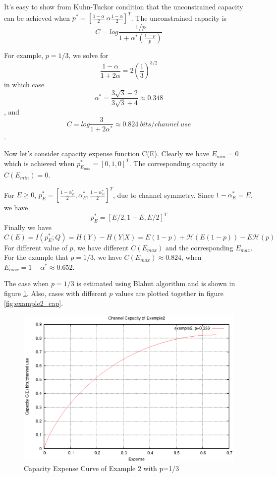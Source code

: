 \documentclass[a4paper,10pt]{article}
\begin{document}
It's easy to show from Kuhn-Tuckor condition that the unconstrained capacity can be achieved when $p^*=[\frac{1-\alpha}{2}\ \alpha \frac{1-\alpha}{2}]^T$. The unconstrained capacity is
\begin{equation}
 C=log{\frac{1/p}{1+\alpha^*\left(\frac{1-p}{p}\right)}}
\end{equation}

For example, $p=1/3$, we solve for
\begin{equation}
 \frac{1-\alpha}{1+2\alpha}=2\left(\frac{1}{3}\right)^{3/2}
\end{equation}
in which case
\[\alpha^*=\frac{3\sqrt{3}-2}{3\sqrt{3}+4}\approx0.348\],
and 
\[C=log{\frac{3}{1+2\alpha^*}}\approx0.824\ bits/channel\ use\].

Now let's consider capacity expense function C(E). Clearly we have $E_{min}=0$ which is achieved when $p_{E_{min}}^*=[0,1,0]^T$. The corresponding capacity is $C(E_{min})=0$.

For $E\geq0$, $p_E^*=[\frac{1-\alpha_E^*}{2},\alpha_E^*,\frac{1-\alpha_E^*}{2}]^T$, due to channel symmetry. Since $1-\alpha_E^*=E$, we have
\begin{equation}
 p_E^*=[E/2,1-E,E/2]^T
\end{equation}
Finally we have
\begin{equation}
 C(E)=I(p_E^*;Q)=H(Y)-H(Y|X)=E(1-p)+\mathcal{H}(E(1-p))-E\mathcal{H}(p)
\end{equation}
For different value of $p$, we have different $C(E_{max})$ and the corresponding $E_{max}$. For the example that $p=1/3$, we have $C(E_{max})\approx0.824$, when $E_{max}=1-\alpha^*\approx0.652$. 

The case when $p=1/3$ is estimated using Blahut algorithm and is shown in figure \ref{fig:example2_p0.3}. Also, cases with different $p$ values are plotted together in figure \ref{fig:example2_cap}.

\begin{figure}
 \centering
 \includegraphics{pic/example2_cap_p0.3.eps}
 \caption{Capacity Expense Curve of Example 2 with p=1/3}
 \label{fig:example2_p0.3}
\end{figure}
\end{document}
